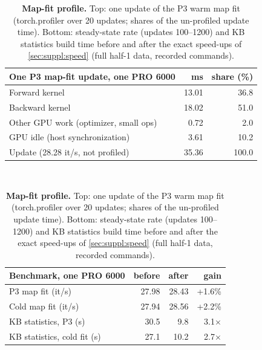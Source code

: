 \begin{table}[t]
\centering
\footnotesize
\setlength{\tabcolsep}{4pt}
\begin{tabular}{@{}lrr@{}}
\toprule
One P3 map-fit update, one PRO 6000 & ms & share (\%) \\
\midrule
Forward kernel & 13.01 & 36.8 \\
Backward kernel & 18.02 & 51.0 \\
Other GPU work (optimizer, small ops) & 0.72 & 2.0 \\
GPU idle (host synchronization) & 3.61 & 10.2 \\
\midrule
Update (28.28 it/s, not profiled) & 35.36 & 100.0 \\
\bottomrule
\end{tabular}
\\[3pt]
\begin{tabular}{@{}lrrr@{}}
\toprule
Benchmark, one PRO 6000 & before & after & gain \\
\midrule
P3 map fit (it/s) & 27.98 & 28.43 & +1.6\% \\
Cold map fit (it/s) & 27.94 & 28.56 & +2.2\% \\
KB statistics, P3 (s) & 30.5 & 9.8 & 3.1$\times$ \\
KB statistics, cold fit (s) & 27.1 & 10.2 & 2.7$\times$ \\
\bottomrule
\end{tabular}
\caption{\textbf{Map-fit profile.} Top: one update of the P3 warm map fit (torch.profiler over 20 updates; shares of the un-profiled update time). Bottom: steady-state rate (updates 100--1200) and KB statistics build time before and after the exact speed-ups of \cref{sec:suppl:speed} (full half-1 data, recorded commands).}
\label{tab:suppl:speedprofile}
\end{table}

